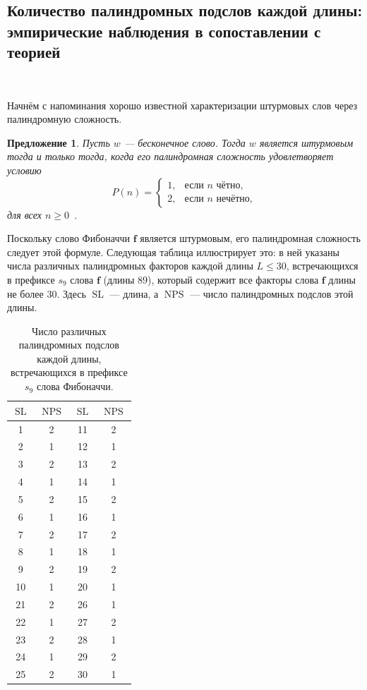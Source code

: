 \documentclass[a4paper,14pt]{extreport}
\theoremstyle{plain}
\newtheorem{proposition}[theorem]{Предложение}
\theoremstyle{definition}
\theoremstyle{remark}
\begin{document}
\subsection{Количество палиндромных подслов каждой длины: эмпирические наблюдения в сопоставлении с теорией}~\label{sec3.4.4}

Начнём с напоминания хорошо известной характеризации штурмовых слов через палиндромную сложность.

\begin{proposition}
	Пусть $w$ --- бесконечное слово. Тогда $w$ является штурмовым тогда и только тогда, когда его палиндромная сложность удовлетворяет условию
	\begin{equation}
		P(n) =
		\begin{cases}
			1, & \text{если $n$ чётно},\\[2pt]
			2, & \text{если $n$ нечётно},
		\end{cases}
	\end{equation}
	для всех $n \ge 0$~\cite{DroubayX,Vuillon}.
\end{proposition}

Поскольку слово Фибоначчи $\mathbf{f}$ является штурмовым, его палиндромная сложность следует этой формуле.
Следующая таблица иллюстрирует это: в ней указаны числа различных палиндромных факторов каждой длины
$L\le 30$, встречающихся в префиксе $s_9$ слова $\mathbf f$ (длины $89$), который содержит все факторы слова
$\mathbf f$ длины не более $30$. Здесь $\operatorname{SL}$ --- длина, а
$\operatorname{NPS}$ --- число палиндромных подслов этой длины.
\begin{table}[H]
	\centering
	\begin{tabular}{|c|c||c|c|}
		\hline
		$\operatorname{SL}$ & $\operatorname{NPS}$   & $\operatorname{SL}$ & $\operatorname{NPS}$ \\
		\hline
		1 & 2 & 11 & 2 \\
		2 & 1 & 12 & 1 \\
		3 & 2 & 13 & 2 \\
		4 & 1 & 14 & 1 \\
		5 & 2 & 15 & 2 \\
		6 & 1 & 16 & 1 \\
		7 & 2 & 17 & 2 \\
		8 & 1 & 18 & 1 \\
		9 & 2 & 19 & 2 \\
		10 & 1 & 20 & 1 \\
		21 & 2 & 26 & 1 \\
		22 & 1 & 27 & 2 \\
		23 & 2 & 28 & 1 \\
		24 & 1 & 29 & 2 \\
		25 & 2 & 30 & 1 \\
		\hline
	\end{tabular}
	\caption{Число различных палиндромных подслов каждой длины, встречающихся в префиксе $s_9$ слова Фибоначчи.}
	\label{tab1duaamade}
\end{table}
\end{document}

